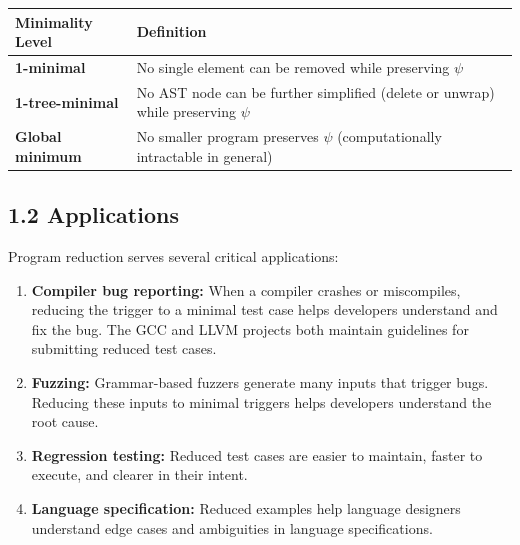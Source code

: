 \documentclass[
  letterpaper,
]{article}
\newcounter{none} %
\begin{document}
{\def\LTcaptype{none} %
\begin{longtable}[]{@{}
  >{\raggedright\arraybackslash}p{}
  >{\raggedright\arraybackslash}p{}@{}}
\toprule\noalign{}
\begin{minipage}[b]{\linewidth}\raggedright
Minimality Level
\end{minipage} & \begin{minipage}[b]{\linewidth}\raggedright
Definition
\end{minipage} \\
\midrule\noalign{}
\endhead
\bottomrule\noalign{}
\endlastfoot
\textbf{1-minimal} & No single element can be removed while preserving
\(\psi\) \\
\textbf{1-tree-minimal} & No AST node can be further simplified (delete
or unwrap) while preserving \(\psi\) \\
\textbf{Global minimum} & No smaller program preserves \(\psi\)
(computationally intractable in general) \\
\end{longtable}
}

\subsection{1.2 Applications}\label{applications}

Program reduction serves several critical applications:

\begin{enumerate}
\def\labelenumi{\arabic{enumi}.}
\item
  \textbf{Compiler bug reporting:} When a compiler crashes or
  miscompiles, reducing the trigger to a minimal test case helps
  developers understand and fix the bug. The GCC and LLVM projects both
  maintain guidelines for submitting reduced test cases.
\item
  \textbf{Fuzzing:} Grammar-based fuzzers generate many inputs that
  trigger bugs. Reducing these inputs to minimal triggers helps
  developers understand the root cause.
\item
  \textbf{Regression testing:} Reduced test cases are easier to
  maintain, faster to execute, and clearer in their intent.
\item
  \textbf{Language specification:} Reduced examples help language
  designers understand edge cases and ambiguities in language
  specifications.
\end{enumerate}
\end{document}
